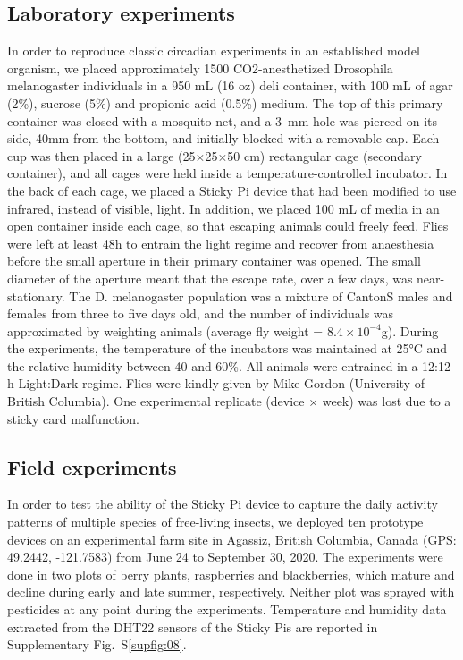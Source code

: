 \documentclass[12pt]{article}
\begin{document}
\begin{linenumbers}
		
		\subsection*{Laboratory experiments}
		In order to reproduce classic circadian experiments in an established model organism, we placed approximately 1500 CO2-anesthetized Drosophila melanogaster individuals in a 950 mL (16 oz) deli container, with 100 mL of agar (2\%), sucrose (5\%) and propionic acid (0.5\%) medium. The top of this primary container was closed with a mosquito net, and a 3~mm hole was pierced on its side, 40mm from the bottom, and initially blocked with a removable cap. Each cup was then placed in a large (25×25×50 cm) rectangular cage (secondary container), and all cages were held inside a temperature-controlled incubator. In the back of each cage, we placed a Sticky Pi device that had been modified to use infrared, instead of visible, light. In addition, we placed 100 mL of media in an open container inside each cage, so that escaping animals could freely feed. Flies were left at least 48h to entrain the light regime and recover from anaesthesia before the small aperture in their primary container was opened. The small diameter of the aperture meant that the escape rate, over a few days, was near-stationary.
		The D. melanogaster population was a mixture of CantonS males and females from three to five days old, and the number of individuals was approximated by weighting animals (average fly weight = $8.4×10^{-4}$g). During the experiments, the temperature of the incubators was maintained at 25°C and the relative humidity between 40 and 60\%. All animals were entrained in a 12:12 h Light:Dark regime. Flies were kindly given by Mike Gordon (University of British Columbia). One experimental replicate (device × week) was lost due to a sticky card malfunction.

		\subsection*{Field experiments}
		In order to test the ability of the Sticky Pi device to capture the daily activity patterns of multiple species of free-living insects, we deployed ten prototype devices on an experimental farm site in Agassiz, British Columbia, Canada (GPS: 49.2442, -121.7583) from June 24 to September 30, 2020. The experiments were done in two plots of berry plants, raspberries and blackberries, which mature and decline during early and late summer, respectively. Neither plot was sprayed with pesticides at any point during the experiments.
		Temperature and humidity data extracted from the DHT22 sensors of the Sticky Pis are reported in Supplementary Fig.~S\ref{supfig:08}.


\end{linenumbers}
\end{document}
